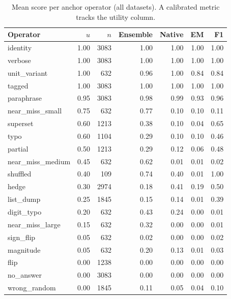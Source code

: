 \begin{table}[t]
\centering
\footnotesize
\caption{Mean score per anchor operator (all datasets). A calibrated metric tracks the utility column.}
\label{tab:probes}

\begin{tabular}{lrrrrrr}
\toprule
Operator & $u$ & $n$ & Ensemble & Native & EM & F1 \\
\midrule
identity & 1.00 & 3083 & 1.00 & 1.00 & 1.00 & 1.00 \\
verbose & 1.00 & 3083 & 1.00 & 1.00 & 1.00 & 1.00 \\
unit\_variant & 1.00 & 632 & 0.96 & 1.00 & 0.84 & 0.84 \\
tagged & 1.00 & 3083 & 1.00 & 1.00 & 1.00 & 1.00 \\
paraphrase & 0.95 & 3083 & 0.98 & 0.99 & 0.93 & 0.96 \\
near\_miss\_small & 0.75 & 632 & 0.77 & 0.10 & 0.10 & 0.11 \\
superset & 0.60 & 1213 & 0.38 & 0.10 & 0.04 & 0.65 \\
typo & 0.60 & 1104 & 0.29 & 0.10 & 0.10 & 0.46 \\
partial & 0.50 & 1213 & 0.29 & 0.12 & 0.06 & 0.48 \\
near\_miss\_medium & 0.45 & 632 & 0.62 & 0.01 & 0.01 & 0.02 \\
shuffled & 0.40 & 109 & 0.74 & 0.40 & 0.01 & 1.00 \\
hedge & 0.30 & 2974 & 0.18 & 0.41 & 0.19 & 0.50 \\
list\_dump & 0.25 & 1845 & 0.15 & 0.14 & 0.01 & 0.39 \\
digit\_typo & 0.20 & 632 & 0.43 & 0.24 & 0.00 & 0.01 \\
near\_miss\_large & 0.15 & 632 & 0.32 & 0.00 & 0.00 & 0.01 \\
sign\_flip & 0.05 & 632 & 0.02 & 0.00 & 0.00 & 0.02 \\
magnitude & 0.05 & 632 & 0.20 & 0.13 & 0.01 & 0.03 \\
flip & 0.00 & 1238 & 0.00 & 0.00 & 0.00 & 0.00 \\
no\_answer & 0.00 & 3083 & 0.00 & 0.00 & 0.00 & 0.00 \\
wrong\_random & 0.00 & 1845 & 0.11 & 0.05 & 0.04 & 0.10 \\
\bottomrule
\end{tabular}

\end{table}